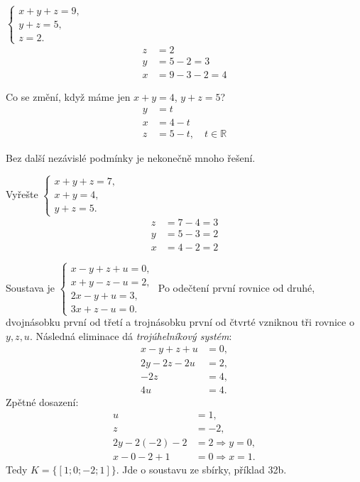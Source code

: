 \documentclass[11pt,a4paper]{article}
\begin{document}
\begin{zadaniReseniBox}[title={Samostatná práce 1}]
$\begin{cases}x+y+z=9,\\y+z=5,\\z=2.\end{cases}$
\tcblower
\begin{align*}
z&=2 \\
 y&=5-2=3 \\
 x&=9-3-2=4
\end{align*}
\end{zadaniReseniBox}
\begin{zadaniReseniBox}[title={Samostatná práce 2}]
Co se změní, když máme jen $x+y=4$, $y+z=5$?
\tcblower
\begin{align*}
y&=t \\
 x&=4-t \\
 z&=5-t,\quad t\in\mathbb R
\end{align*}

Bez další nezávislé podmínky je nekonečně mnoho řešení.
\end{zadaniReseniBox}
\begin{zadaniReseniBox}[title={Samostatná práce 3}]
Vyřešte $\begin{cases}x+y+z=7,\\x+y=4,\\y+z=5.\end{cases}$
\tcblower
\begin{align*}
z&=7-4=3 \\
 y&=5-3=2 \\
 x&=4-2=2
\end{align*}
\end{zadaniReseniBox}
\begin{zadaniReseniBox}[title={Rozšíření 1}]
Soustava je $\begin{cases}x-y+z+u=0,\\x+y-z-u=2,\\2x-y+u=3,\\3x+z-u=0.\end{cases}$
\tcblower
Po odečtení první rovnice od druhé, dvojnásobku první od třetí a trojnásobku první od čtvrté vzniknou tři rovnice o $y,z,u$. Následná eliminace dá \emph{trojúhelníkový systém}:
\begin{align*}
 x-y+z+u&=0,\\
 2y-2z-2u&=2,\\
 -2z&=4,\\
 4u&=4.
\end{align*}
Zpětné dosazení:
\begin{align*}
u&=1,\\ z&=-2,\\ 2y-2(-2)-2&=2\Rightarrow y=0,\\ x-0-2+1&=0\Rightarrow x=1.
\end{align*}
Tedy $K=\{[1;0;-2;1]\}$. Jde o soustavu ze sbírky, příklad 32b.
\end{zadaniReseniBox}
\end{document}
